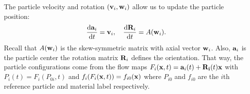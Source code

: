 The particle velocity and rotation $({\bf v}_i, {\bf w}_i)$ allow us to update the particle position:
\begin{alignat}{3}
\label{Hupdate1}   \frac{\dif {\bf a}_i}{\dif t} = {\bf v}_i,      \quad  \frac{\dif {\bf R}_i}{\dif t}  = A({\bf w}_i).
\end{alignat}
Recall that $A({\bf w}_i)$ is the skew-symmetric matrix with axial vector ${\bf w}_i$.
Also, ${\bf a}_i$ is the particle center the rotation matrix ${\bf R}_i$ defines the orientation.
That way, the particle configurations come from the flow maps $F_i({\bf x},t) = {\bf a}_i(t) + {\bf R_i}(t){\bf x}$ with
$P_i(t) = F_i(P_{0i},t)$ and $f_i(F_i({\bf x},t)) = f_{i0}({\bf x})$ where $P_{i0}$ and $f_{i0}$ are the $i$th reference particle
and material label respectively.






